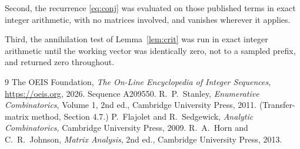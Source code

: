 \documentclass[11pt,a4paper]{article}
\theoremstyle{plain}
\theoremstyle{definition}
\begin{document}
Second, the recurrence \eqref{eq:conj} was evaluated on those published terms in exact
integer arithmetic, with no matrices involved, and vanishes wherever it applies.

Third, the annihilation test of Lemma~\ref{lem:crit} was run in exact integer arithmetic
until the working vector was identically zero, not to a sampled prefix, and returned zero
throughout.

\begin{thebibliography}{9}
 The OEIS Foundation, \emph{The On-Line Encyclopedia of Integer
Sequences}, \url{https://oeis.org}, 2026. Sequence A209550.
 R.~P.~Stanley, \emph{Enumerative Combinatorics}, Volume 1, 2nd ed.,
Cambridge University Press, 2011. (Transfer-matrix method, Section 4.7.)
 P.~Flajolet and R.~Sedgewick, \emph{Analytic Combinatorics}, Cambridge
University Press, 2009.
 R.~A.~Horn and C.~R.~Johnson, \emph{Matrix Analysis}, 2nd ed., Cambridge
University Press, 2013.
\end{thebibliography}
\end{document}
